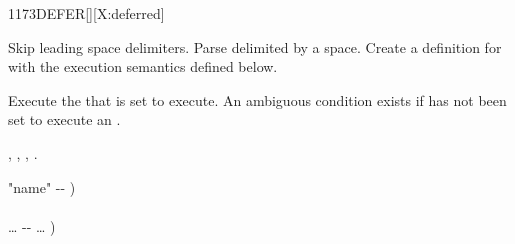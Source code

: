 %
%
%
%
%


\begin{worddef}{1173}{DEFER}[][X:deferred]
\item {}

	Skip leading space delimiters.  Parse  delimited by a
	space.  Create a definition for  with the execution
	semantics defined below.

\execute[name]

	Execute the  that  is set to execute.
	An ambiguous condition exists if  has not been
	set to execute an .

\see {},
	,
	,
	.

	\begin{implement} %
		\word{:}   "name" -{}- ) \\
		\tab {} \word{[']}  \word{,} \\
		  {\ldots} -{}- {\ldots} ) \\
		\tab {}  \word{;}
	\end{implement}

	\begin{testing} %
		 \\
		 \\

		 \\
	\end{testing}
\end{worddef}


